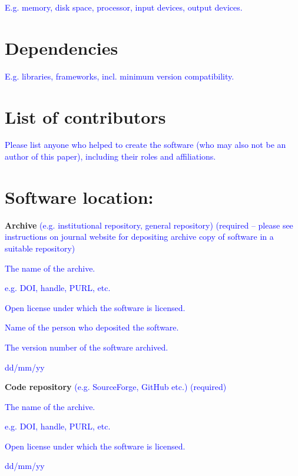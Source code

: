 \documentclass{jors}
\begin{document}
\textcolor{blue}{E.g. memory, disk space, processor, input devices, output devices.}

\section*{Dependencies}

\textcolor{blue}{E.g. libraries, frameworks, incl. minimum version compatibility.}

\section*{List of contributors}

\textcolor{blue}{Please list anyone who helped to create the software (who may also not be an author of this paper), including their roles and affiliations.}

\section*{Software location:}

{\bf Archive} \textcolor{blue}{(e.g. institutional repository, general repository) (required – please see instructions on journal website for depositing archive copy of software in a suitable repository)} 

\begin{description}[noitemsep,topsep=0pt]
	\item[Name:] \textcolor{blue}{The name of the archive.}
	\item[Persistent identifier:] \textcolor{blue}{e.g. DOI, handle, PURL, etc.}
	\item[Licence:] \textcolor{blue}{Open license under which the software is licensed.}
	\item[Publisher:]  \textcolor{blue}{Name of the person who deposited the software.}
	\item[Version published:] \textcolor{blue}{The version number of the software archived.}
	\item[Date published:] \textcolor{blue}{dd/mm/yy}
\end{description}



{\bf Code repository} \textcolor{blue}{(e.g. SourceForge, GitHub etc.) (required)}

\begin{description}[noitemsep,topsep=0pt]
	\item[Name:] \textcolor{blue}{The name of the archive.}
	\item[Persistent identifier:] \textcolor{blue}{e.g. DOI, handle, PURL, etc.}
	\item[Licence:] \textcolor{blue}{Open license under which the software is licensed.}
	\item[Date published:] \textcolor{blue}{dd/mm/yy}
\end{description}
\end{document}
